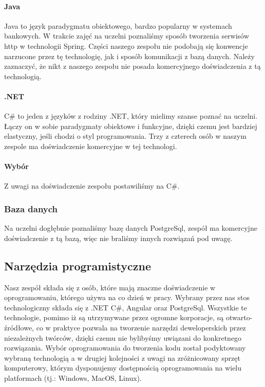 \paragraph{Java}
Java to język paradygmatu obiektowego, bardzo popularny w systemach bankowych.
W trakcie zajęć na uczelni poznaliśmy sposób tworzenia serwisów \acrshort{http} w technologii Spring.
Części naszego zespołu nie podobają się konwencje narzucone przez tę technologię, jak i sposób komunikacji z bazą danych.
Należy zaznaczyć, że nikt z naszego zespołu nie posada komercyjnego doświadczenia z tą technologią.

\paragraph{.NET}
C\# to jeden z języków z rodziny .NET, który mielimy szanse poznać na uczelni.
Łączy on w sobie paradygmaty obiektowe i funkcyjne, dzięki czemu jest bardziej elastyczny, jeśli chodzi o styl programowania.
Trzy z czterech osób w naszym zespole ma doświadczenie komercyjne w tej technologi.

\paragraph{Wybór}
Z uwagi na doświadczenie zespołu postawiliśmy na C\#.

\subsubsection{Baza danych}
Na uczelni dogłębnie poznaliśmy bazę danych PostgreSql, zespół ma komercyjne doświadczenie z tą bazą, więc nie braliśmy innych rozwiązań pod uwagę.

\subsection{Narzędzia programistyczne}
\label{subsec:narzedzia-programistyczne}
Nasz zespół składa się z osób, które mają znaczne doświadczenie w oprogramowaniu, którego używa na co dzień w pracy.
Wybrany przez nas stos technologiczny składa się z .NET C\#, Angular oraz PostgreSql.
Wszystkie te technologie, pomimo iż są utrzymywane przez ogromne korporacje, są otwarto-źródłowe, co w praktyce pozwala na tworzenie narzędzi deweloperskich przez niezależnych twórców, dzięki czemu nie bylibyśmy uwiązani do konkretnego rozwiązania.
Wybór oprogramowania do tworzenia kodu został podyktowany wybraną technologią a w drugiej kolejności z uwagi na zróżnicowany sprzęt komputerowy, którym dysponujemy  dostępnością oprogramowania na wielu platformach (tj.: Windows, MacOS, Linux).

